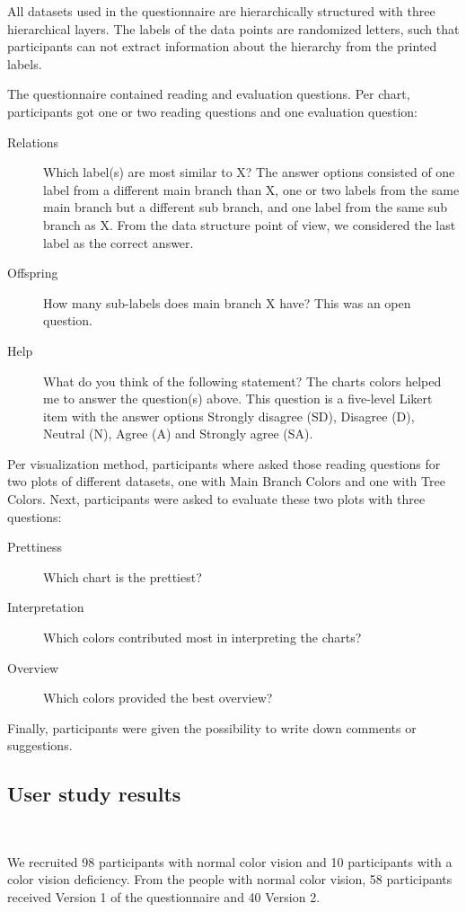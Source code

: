 \documentclass[review,journal]{vgtc}         %
\begin{document}
All datasets used in the questionnaire are hierarchically structured with three hierarchical layers. The 
labels of the data points are randomized letters, such that participants can not extract information 
about the hierarchy from the printed labels.

The questionnaire contained reading and evaluation questions. Per chart, participants got one or two reading questions and one evaluation question:
\begin{description}
\item[Relations] Which label(s) are most similar to X? The answer options consisted of one label from a different main branch than X, one or two labels from the same main branch but a different sub branch, and one label from the same sub branch as X. From the data structure point of view, we considered the last label as the correct answer.
\item[Offspring] How many sub-labels does main branch X have? This was an open question.
\item[Help] What do you think of the following statement? The charts colors helped me to answer the question(s) above. This question is a five-level Likert item with the answer options Strongly disagree (SD), Disagree (D), Neutral (N), Agree (A) and Strongly agree (SA).
\end{description}
Per visualization method, participants where asked those reading questions for two plots of different datasets, one with Main Branch Colors and one with Tree Colors. 
Next, participants were asked to evaluate these two plots with three questions:
\begin{description}
\item[Prettiness] Which chart is the prettiest?
\item[Interpretation] Which colors contributed most in interpreting the charts?
\item[Overview] Which colors provided the best overview?
\end{description}
Finally, participants were given the possibility to write down comments or suggestions.

\subsection{User study results}~\label{secuserres}

We recruited 98 participants with normal color vision and 10 participants with a color vision deficiency. From the people with normal color vision, 58 participants received Version 1 of the questionnaire and 40 Version 2.
\end{document}
